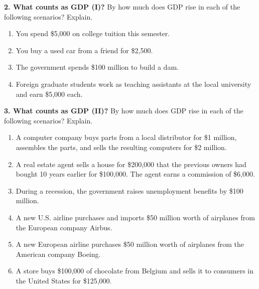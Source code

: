 \noindent\textbf{2. What counts as GDP (I)?} By how much does GDP rise in each of the following scenarios? Explain.
\begin{enumerate}[label=(\alph*),leftmargin=2.2em,topsep=2pt,itemsep=1pt]
\item You spend \$5,000 on college tuition this semester.
\item You buy a used car from a friend for \$2,500.
\item The government spends \$100 million to build a dam.
\item Foreign graduate students work as teaching assistants at the local university and earn \$5,000 each.
\end{enumerate}
\noindent\textbf{3. What counts as GDP (II)?} By how much does GDP rise in each of the following scenarios? Explain.
\begin{enumerate}[label=(\alph*),leftmargin=2.2em,topsep=2pt,itemsep=1pt]
\item A computer company buys parts from a local distributor for \$1 million, assembles the parts, and sells the resulting
computers for \$2 million.
\item A real estate agent sells a house for \$200,000 that the previous owners had bought 10 years earlier for \$100,000. The agent
earns a commission of \$6,000.
\item During a recession, the government raises unemployment benefits by \$100 million.
\item A new U.S. airline purchases and imports \$50 million worth of airplanes from the European company Airbus.
\item A new European airline purchases \$50 million worth of airplanes from the American company Boeing.
\item A store buys \$100,000 of chocolate from Belgium and sells it to consumers in the United States for \$125,000.
\end{enumerate}
\resolespaco
